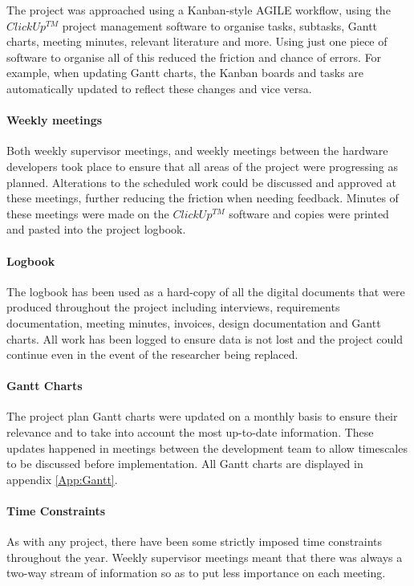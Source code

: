 The project was approached using a Kanban-style AGILE workflow, using the $ClickUp^{TM}$ project management software to organise tasks, subtasks, Gantt charts, meeting minutes, relevant literature and more. Using just one piece of software to organise all of this reduced the friction and chance of errors. For example, when updating Gantt charts, the Kanban boards and tasks are automatically updated to reflect these changes and vice versa.

\paragraph{Weekly meetings}
Both weekly supervisor meetings, and weekly meetings between the hardware developers took place to ensure that all areas of the project were progressing as planned. Alterations to the scheduled work could be discussed and approved at these meetings, further reducing the friction when needing feedback. Minutes of these meetings were made on the $ClickUp^{TM}$ software and copies were printed and pasted into the project logbook.

\paragraph{Logbook}
The logbook has been used as a hard-copy of all the digital documents that were produced throughout the project including interviews, requirements documentation, meeting minutes, invoices, design documentation and Gantt charts. All work has been logged to ensure data is not lost and the project could continue even in the event of the researcher being replaced. 

\paragraph{Gantt Charts}
The project plan Gantt charts were updated on a monthly basis to ensure their relevance and to take into account the most up-to-date information. These updates happened in meetings between the development team to allow timescales to be discussed before implementation. All Gantt charts are displayed in appendix \ref{App:Gantt}.

\paragraph{Time Constraints}
As with any project, there have been some strictly imposed time constraints throughout the year. Weekly supervisor meetings meant that there was always a two-way stream of information so as to put less importance on each meeting. 

